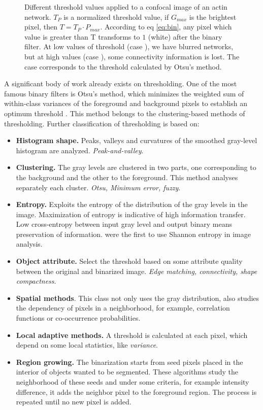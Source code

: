 \begin{figure}[!htb]
\caption[Different threshold values on networks]{Different threshold values applied to a confocal image of an actin network.
$T_P$ is a normalized threshold value, if $G_{max}$ is the brightest pixel, then
$T=T_P\cdot P_{max}$. According to eq \ref{eq:bin}, any pixel which value is greater than T transforms to $1$
(white) after the binary filter.
At low values of threshold (case ), we have blurred networks, but
at high values (case ), some connectivity information is lost.
The case  corresponds to the threshold calculated by Otsu's
method.}
\label{fig:binary}
\end{figure}

A significant body of work already exists on thresholding. One of the most famous binary
filters is Otsu's method, which minimizes the weighted sum of within-class variances of the
foreground and background pixels to establish an optimum threshold
\citep{sezgin_survey_2004}. This method belongs to the clustering-based methods
of thresholding. Further classification of thresholding is based on:
\begin{itemize}
  \item \textbf{Histogram shape.} Peaks, valleys and curvatures of the smoothed
  gray-level histogram are analyzed. \emph{Peak-and-valley}.
  \item \textbf{Clustering.} The gray levels are clustered in two parts, one
  corresponding to the background and the other to the foreground. This method
  analyses separately each cluster. \emph{Otsu, Minimum error, fuzzy}.
  \item \textbf{Entropy.} Exploits the entropy of the distribution of the gray
  levels in the image. Maximization of entropy is indicative of high information transfer.
  Low cross-entropy between input gray level and output binary means
  preservation of information. \citet{pal_automatic_1983}
  were the first to use Shannon entropy in image analysis.
 \citep{pal_image_1988}
  \item \textbf{Object attribute.} Select the threshold based on some attribute
  quality between the original and binarized image. \emph{Edge matching, connectivity,
  shape compactness}.
  \item \textbf{Spatial methods}. This class not only uses the gray
  distribution, also studies the dependency of pixels in a neighborhood, for example, correlation
functions or co-occurrence probabilities.
  \item \textbf{Local adaptive methods.} A threshold is calculated at each
  pixel, which depend on some local statistics, like \emph{variance}.
  \item \textbf{Region growing.} The binarization starts from seed pixels placed in the interior
    of objects wanted to be segmented. These algorithms study the neighborhood of these seeds and under some criteria, for example intensity difference, it adds the neighbor pixel to the foreground region. The process is repeated until no new pixel is added.
\end{itemize}

